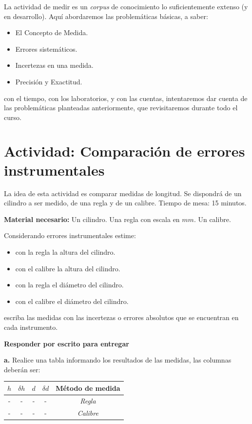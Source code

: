 \documentclass[10pt,a4paper]{article}
\numberwithin{equation}{section}%
\numberwithin{equation}{subsection}
\begin{document}
La actividad de medir es un \textit{corpus} de conocimiento lo suficientemente extenso (y en desarrollo). Aquí abordaremos las problemáticas básicas, a saber:

\begin{itemize}
\item[$\bullet$] El Concepto de Medida. 
\item[$\bullet$] Errores sistemáticos.
\item[$\bullet$] Incertezas en una medida.
\item[$\bullet$] Precisión y Exactitud.
\end{itemize}

\noindent con el tiempo, con los laboratorios, y con las cuentas, intentaremos dar cuenta de las problemáticas planteadas anteriormente, que revisitaremos durante todo el curso.

\section{Actividad: Comparación de errores instrumentales}
La idea de esta actividad es comparar medidas de longitud. Se dispondrá de un cilindro a ser medido, de una regla y de un calibre. Tiempo de mesa: 15 minutos.

\textbf{Material necesario:} Un cilindro. Una regla con escala en $mm$. Un calibre. 

Considerando errores instrumentales estime:
\begin{itemize}
\item[1)] con la regla la altura del cilindro.
\item[2)] con el calibre la altura del cilindro.
\item[3)] con la regla el diámetro del cilindro.
\item[4)] con el calibre el diámetro del cilindro.
\end{itemize}

\noindent escriba las medidas con las incertezas o errores absolutos que se encuentran en cada instrumento.

\textbf{Responder por escrito para entregar}

\noindent \textbf{a.} Realice una tabla informando los resultados de las medidas, las columnas deberán ser:

\begin{table}[h!]
\begin{center}
\vspace*{0mm}
\begin{tabular}{||c|c|c|c|c||}
\hline
\hline
$h$ &$\delta h$ & $d$ & $\delta d$ & Método de medida \\
\hline
\hline
-&-&-&-&\textit{Regla }\\ 
\hline
-&-&-&-&\textit{Calibre }\\
\hline
\hline
\end{tabular}
\end{center}
\end{table}
\end{document}
